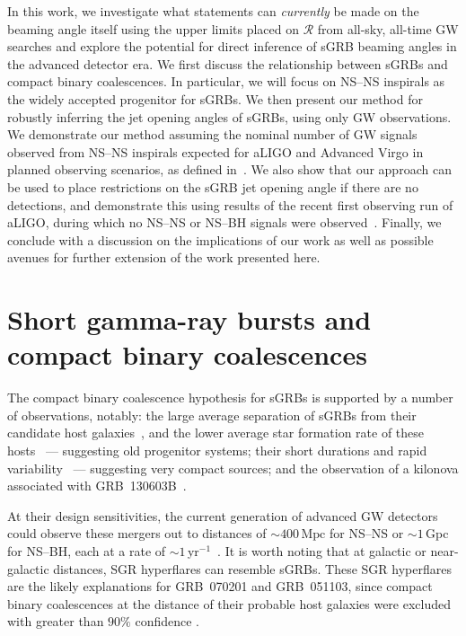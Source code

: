 \documentclass[twocolumn,nofootinbib]{revtex4-1}
\newcommand{\cbcrate}{{{\mathcal R}}}
\newcommand{\mpc}{\mathrm{Mpc}}
\newcommand{\BNS}{\ac{NS}--\ac{NS}\xspace}
\newcommand{\NSBH}{\ac{NS}--\ac{BH}\xspace}
\newcommand{\arw}[1]{{\color{dgreen}{#1}}}
\begin{document}
In this work, we investigate what statements can \emph{currently} be
made on the beaming angle itself using the upper limits placed on
$\cbcrate$ from all-sky, all-time \ac{GW} searches and explore the
potential for direct inference of \ac{sGRB} beaming angles in the
advanced detector era.  We first discuss the relationship between
\acp{sGRB} and compact binary coalescences.  In particular, we will
focus on \BNS inspirals as the widely accepted progenitor for
\acp{sGRB}.  We then present our method for robustly inferring the jet
opening angles of \acp{sGRB}, using only \ac{GW} observations.  We
demonstrate our method assuming the nominal number of \ac{GW} signals
observed from \BNS inspirals expected for \ac{aLIGO} and Advanced
Virgo in planned \arw{`2017--2018' and `2022+'?} observing scenarios,
as defined in~\cite{Aasi:2013wya}.  We also show that our approach can
be used to place restrictions on the \ac{sGRB} jet opening angle if
there are no detections, and demonstrate this using results of the
recent first observing run of \ac{aLIGO}, during which no \BNS or
\NSBH signals were observed~\cite{Abbott:2016ymx}.  Finally, we
conclude with a discussion on the implications of our work as well as
possible avenues for further extension of the work presented here.


\section{Short gamma-ray bursts and compact binary coalescences}
\label{sec:sgrbs}
The compact binary coalescence hypothesis for \acp{sGRB} is supported
by a number of observations, notably: the large average separation of
\acp{sGRB} from their candidate host galaxies~\cite{Church:2011gk},
and the lower average star formation rate of these
hosts~\cite{Fong:2013eqa} --- suggesting old progenitor systems; their
short durations and rapid variability~\cite{Rees:1994nw} ---
suggesting very compact sources; and the observation of a kilonova
associated with GRB~130603B~\cite{Berger:2013wna,Tanvir:2013pia}.

At their design sensitivities, the current generation of advanced
\ac{GW} detectors could observe these mergers out to distances of
$\sim 400\,\mpc$ for \BNS or $\sim 1\,$Gpc for \NSBH, each at a rate of
$\sim 1\,$yr$^{-1}$~\cite{Aasi:2013wya}.  It is worth noting that at
galactic or near-galactic distances, \ac{SGR} hyperflares can resemble
\acp{sGRB}.  These \ac{SGR} hyperflares are the likely explanations
for GRB~070201 and GRB~051103, since compact binary coalescences at
the distance of their probable host galaxies were excluded with
greater than $90\%$ confidence \cite{Abbott:2007rh,Abadie:2012bz}.
\end{document}
